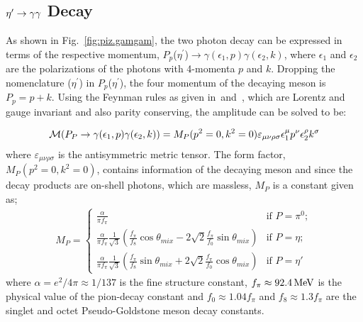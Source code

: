 \subsection{$\eta^{\prime} \to \gamma \gamma$  Decay}\label{sec:piz.gg}
As shown in Fig.~\ref{fig:piz.gamgam}, the two photon decay can be expressed in terms of the respective momentum, $P_p$($\eta^{\prime}$)$\to \gamma(\epsilon_1,p) \gamma(\epsilon_2,k)$, where $\epsilon_1$ and $\epsilon_2$ are the polarizations of the photons with 4-momenta $p$ and $k$. Dropping the nomenclature ($\eta^{\prime}$) in $P_p$($\eta^{\prime}$), the four momentum of the decaying meson is $P_p= p+k$. Using the Feynman rules as given in~\cite{peskin}and~\cite{halzen}, which are Lorentz and gauge invariant and also parity conserving, the amplitude can be solved to be:

\begin{align}\label{eq:piz.gg.amp}
 {\cal M}(P_P \to \gamma(\epsilon_1,p) \gamma(\epsilon_2,k))= {M}_P(p^2=0,k^2=0) \varepsilon_{\mu\nu\rho\sigma}\epsilon_1^\mu p^\nu \epsilon_2^\rho k^\sigma
\end{align}
where $\varepsilon_{\mu\nu\rho\sigma}$ is the antisymmetric metric tensor. The form factor, ${M}_P(p^2=0,k^2=0)$, contains information of the decaying meson and since the decay products are on-shell photons, which are massless, ${M}_P$ is a constant given as;
\begin{align}\label{eq:decay.constants}
 {M}_P=\begin{cases}
         {\displaystyle\frac{\alpha}{\pi f_{\pi}}} & \mbox{if $P=\pi^0$};\\
        {\displaystyle\frac{\alpha}{\pi f_\pi} \frac{1}{\sqrt{3}} }\left( \frac{f_\pi}{f_8} \cos\theta_{mix} -2\sqrt{2} \frac{f_\pi}{f_0} \sin\theta_{mix} \right)& \mbox{if $P=\eta$};\\
        {\displaystyle\frac{\alpha}{\pi f_\pi} \frac{1}{\sqrt{3}}} \left( \frac{f_\pi}{f_8} \sin\theta_{mix} +2\sqrt{2} \frac{f_\pi}{f_0} \cos\theta_{mix} \right)& \mbox{if $P=\eta'$} \,
\end{cases}
\end{align}
where $\alpha=e^2/4\pi \approx 1/137$ is the fine structure constant, $f_\pi \approx 92.4 \,{\rm MeV}$ is the physical value of the pion-decay constant and $f_0 \approx 1.04 f_\pi$ and $f_8 \approx 1.3 f_\pi$ are the singlet and octet Pseudo-Goldstone meson decay constants.

